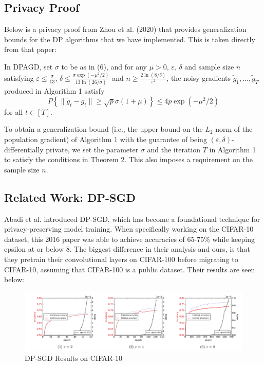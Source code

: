\subsection{Privacy Proof}\label{subsec:privacy-proof}
Below is a privacy proof from Zhou et al. (2020) \cite{zhou_2020_private_adaptive_algorithms} that provides generalization bounds for the DP algorithms that we have implemented. This
is taken directly from that paper:


In DPAGD, set $\sigma$ to be as in (6), and for any $\mu > 0$, $\varepsilon$, $\delta$ and sample size $n$ satisfying $\varepsilon \leq \frac{\sigma}{13}$,
$\delta \leq \frac{\sigma \exp(-\mu^2/2)}{13 \ln(26/\sigma)}$ and $n \geq \frac{2 \ln(8/\delta)}{\varepsilon^2}$, the noisy gradients $\tilde{g}_1, \dots, \tilde{g}_T$ produced in Algorithm 1 satisfy
\[
P \left\{ \|\tilde{g}_t - g_t\| \geq \sqrt{p} \sigma (1 + \mu) \right\} \leq 4p \exp(-\mu^2/2)
\]
for all $t \in [T]$.

To obtain a generalization bound (i.e., the upper bound on the $L_2$-norm of the population gradient) of Algorithm 1 with the guarantee of being $(\varepsilon, \delta)$-differentially private, we set the parameter $\sigma$ and the iteration $T$ in Algorithm 1 to satisfy the conditions in Theorem 2. This also imposes a requirement on the sample size $n$. 



\subsection{Related Work: DP-SGD}\label{subsec:related-work}
Abadi et al. \cite{Abadi_2016_DeepLearningDifferentialPrivacy} introduced DP-SGD, which has become a foundational technique for
privacy-preserving model training. When specifically working on the CIFAR-10 dataset, this 2016 paper was able to achieve accuracies
of 65-75\% while keeping epsilon at or below 8. The biggest difference in their analysis and ours, is that they pretrain their convolutional
layers on CIFAR-100 before migrating to CIFAR-10, assuming that CIFAR-100 is a public dataset. Their results are seen below:
\begin{figure}[ht]
    \centering
    \includegraphics[width=\textwidth]{dp-sgd_results.PNG}
    \caption{DP-SGD Results on CIFAR-10 \cite{Abadi_2016_DeepLearningDifferentialPrivacy}}
    \label{fig:image_label}
\end{figure}

